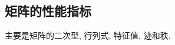 \documentclass[lang=cn,10pt]{gorgeousnbook}
\numberwithin{equation}{section}%
\numberwithin{figure}{section}%
\begin{document}

\subsection{矩阵的性能指标}
主要是矩阵的二次型, 行列式, 特征值, 迹和秩. 
\end{document}
